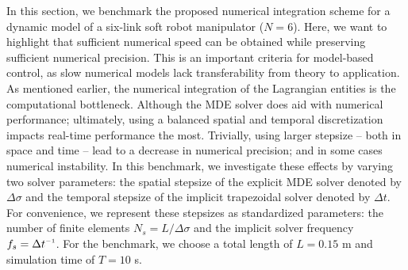 \begin{example}\end{example}
\noindent In this section, we benchmark the proposed numerical integration scheme for a dynamic model of a six-link soft robot manipulator ($N = 6$). Here, we want to highlight that sufficient numerical speed can be obtained while preserving sufficient numerical precision. This is an important criteria for model-based control, as slow numerical models lack transferability from theory to application. As mentioned earlier, the numerical integration of the Lagrangian entities is the computational bottleneck. Although the MDE solver does aid with numerical performance; ultimately, using a balanced spatial and temporal discretization impacts real-time performance the most. Trivially, using larger stepsize -- both in space and time -- lead to a decrease in numerical precision; and in some cases numerical instability. In this benchmark, we investigate these effects by varying two solver parameters: the spatial stepsize of the explicit MDE solver denoted by $\Delta \sigma$ and the temporal stepsize of the implicit trapezoidal solver denoted by $\Delta t$. For convenience, we represent these stepsizes as standardized parameters: the number of finite elements $N_s = L/\Delta \sigma$ and the implicit solver frequency $f_s = \Delta t\inv$. For the benchmark, we choose a total length of $L = 0.15$ m and simulation time of $T = 10$ s.


